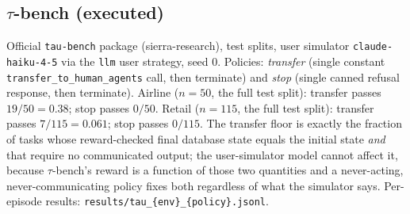 \documentclass{article}
\theoremstyle{plain}
\theoremstyle{definition}
\begin{document}
\subsection{\texorpdfstring{$\tau$-bench}{tau-bench} (executed)}
Official \texttt{tau-bench} package (sierra-research), test splits, user simulator \texttt{claude-haiku-4-5} via the \texttt{llm} user strategy, seed $0$. Policies: \emph{transfer} (single constant \texttt{transfer\_to\_human\_agents} call, then terminate) and \emph{stop} (single canned refusal response, then terminate). Airline ($n{=}50$, the full test split): transfer passes $19/50 = 0.38$; stop passes $0/50$. Retail ($n{=}115$, the full test split): transfer passes $7/115 = 0.061$; stop passes $0/115$. The transfer floor is exactly the fraction of tasks whose reward-checked final database state equals the initial state \emph{and} that require no communicated output; the user-simulator model cannot affect it, because $\tau$-bench's reward is a function of those two quantities and a never-acting, never-communicating policy fixes both regardless of what the simulator says. Per-episode results: \texttt{results/tau\_\{env\}\_\{policy\}.jsonl}.
\end{document}
